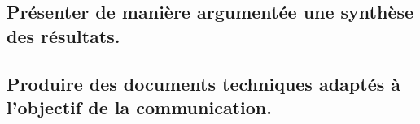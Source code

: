 \documentclass[10pt,fleqn]{book}
\newcommand{\repRel}{../..}
\newcommand{\repStyle}{\repRel/Style}
\newcommand{\td}{fichier_td}
\newcommand{\repExos}{\repRel/ExercicesCompetences}
\newcommand{\repExo}{dossier}
\begin{document}
\subsection{Présenter de manière argumentée une synthèse des résultats.} 

\begin{multicols}{2} 

\end{multicols}

\subsection{Produire des documents techniques adaptés à l'objectif de la communication. } 

\begin{multicols}{2} 

\renewcommand{\repExo}{\repExos/E2_ProduireInformation/E2_05_Dessin2D/1000_Dessin2D}
\renewcommand{\td}{1000_Dessin2D}
\graphicspath{{\repStyle/png/}{\repExo/images/}}


\renewcommand{\repExo}{\repExos/E2_ProduireInformation/E2_05_Dessin2D/1001_Dessin2D}
\renewcommand{\td}{1001_Dessin2D}
\graphicspath{{\repStyle/png/}{\repExo/images/}}


\renewcommand{\repExo}{\repExos/E2_ProduireInformation/E2_05_Dessin2D/1002_Dessin2D}
\renewcommand{\td}{1002_Dessin2D}
\graphicspath{{\repStyle/png/}{\repExo/images/}}


\renewcommand{\repExo}{\repExos/E2_ProduireInformation/E2_05_Dessin2D/1003_Dessin2D}
\renewcommand{\td}{1003_Dessin2D}
\graphicspath{{\repStyle/png/}{\repExo/images/}}


\renewcommand{\repExo}{\repExos/E2_ProduireInformation/E2_05_Dessin2D/1004_Dessin2D}
\renewcommand{\td}{1004_Dessin2D}
\graphicspath{{\repStyle/png/}{\repExo/images/}}


\renewcommand{\repExo}{\repExos/E2_ProduireInformation/E2_05_Dessin2D/1005_Dessin2D}
\renewcommand{\td}{1005_Dessin2D}
\graphicspath{{\repStyle/png/}{\repExo/images/}}


\renewcommand{\repExo}{\repExos/E2_ProduireInformation/E2_05_Dessin2D/1006_Dessin2D}
\renewcommand{\td}{1006_Dessin2D}
\graphicspath{{\repStyle/png/}{\repExo/images/}}


\renewcommand{\repExo}{\repExos/E2_ProduireInformation/E2_05_Dessin2D/1007_Dessin2D}
\renewcommand{\td}{1007_Dessin2D}
\graphicspath{{\repStyle/png/}{\repExo/images/}}



\end{multicols}
\end{document}
